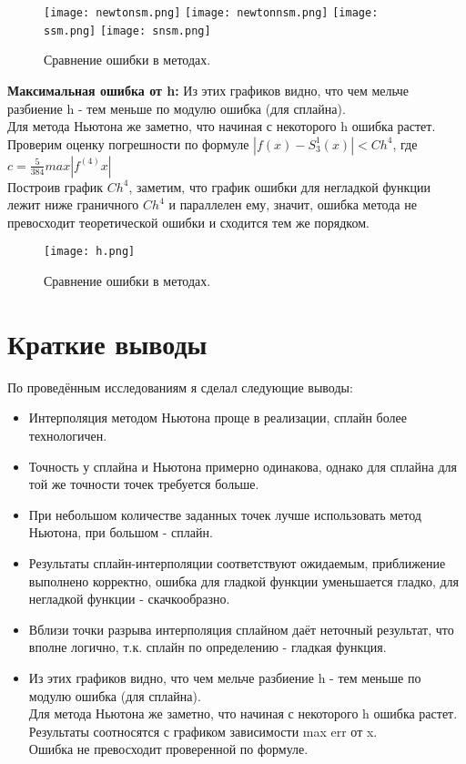 \documentclass[12pt]{article}
\begin{document}
\begin{figure}[h!]
\center
\texttt{[image: newtonsm.png]}
\texttt{[image: newtonnsm.png]}
\texttt{[image: ssm.png]}
\texttt{[image: snsm.png]}
\caption{Сравнение ошибки в методах.}
\end{figure}
\newpage
\textbf{Максимальная ошибка от h:}
Из этих графиков видно, что чем мельче разбиение h - тем меньше по модулю ошибка (для сплайна).\\
Для метода Ньютона же заметно, что начиная с некоторого h ошибка растет.\\
Проверим оценку погрешности по формуле $\displaystyle |f(x) - S_3^1(x)| < Ch^4$, где  $\displaystyle c = \frac{5}{384} max|f^{(4)}x|$\\
Построив график $Ch^4$, заметим, что график ошибки для негладкой функции лежит ниже граничного $Ch^4$ и параллелен ему, значит, ошибка метода не превосходит теоретической ошибки и сходится тем же порядком.
\begin{figure}[h!]
\center
\texttt{[image: h.png]}
\caption{Сравнение ошибки в методах.}
\end{figure}

\section{Краткие выводы}
По проведённым исследованиям я сделал следующие выводы:
\begin{itemize}
    \item Интерполяция методом Ньютона проще в реализации, сплайн более технологичен.
    \item Точность у сплайна и Ньютона примерно одинакова, однако для сплайна для той же точности точек требуется больше.
    \item При небольшом количестве заданных точек лучше использовать метод Ньютона, при большом - сплайн.
    \item Результаты сплайн-интерполяции соответствуют ожидаемым, приближение выполнено корректно, ошибка для гладкой функции уменьшается гладко, для негладкой функции - скачкообразно. 
    \item Вблизи точки разрыва интерполяция сплайном даёт неточный результат, что вполне логично, т.к. сплайн по определению - гладкая функция.
    \item Из этих графиков видно, что чем мельче разбиение h - тем меньше по модулю ошибка (для сплайна).\\
Для метода Ньютона же заметно, что начиная с некоторого h ошибка растет.\\
Результаты соотносятся с графиком зависимости max err от x.\\
Ошибка не превосходит проверенной по формуле.
\end{itemize}
\end{document}
